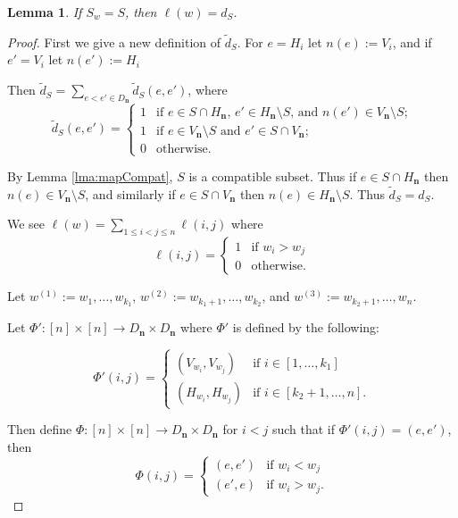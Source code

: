 \documentclass{amsart}
\newtheorem{lma}{Lemma}
\newcommand{\bfn}{\mathbf{n}}
\begin{document}
\begin{lma}\label{lma:lenMatch}
If $S_w=S$, then $\ell(w)=d_S$.
\end{lma}
\begin{proof}
First we give a new definition of $\widetilde{d}_S$. For $e=H_i$ let $n(e):=V_i$, and if $e'=V_i$ let $n(e'):=H_i$

 Then $\widetilde{d}_S=\sum\limits_{e<e'\in D_\bfn} \widetilde{d}_S(e,e')$, where
  \[
    \widetilde{d}_S(e,e')=
    \begin{cases}
      1 & \text{if $e\in S\cap H_\bfn$,  $e'\in H_\bfn\setminus S$, and $n(e')\in V_\bfn\setminus S$;}\\
      1 & \text{if $e\in V_\bfn\setminus S$ and $e'\in S\cap V_\bfn$;}\\
      0 & \text{otherwise.}
    \end{cases}
  \]


By Lemma \ref{lma:mapCompat}, $S$ is a compatible subset. Thus if $e\in S\cap H_\bfn$ then $n(e)\in V_\bfn\setminus S$, and similarly if $e\in S\cap V_\bfn$ then $n(e)\in H_\bfn\setminus S$. 
Thus $\widetilde{d}_S={d}_S$.


We see $\ell(w)=\sum\limits_{1\leq i<j\leq n} \ell(i,j)$
where 
 \[
    \ell(i,j)=
    \begin{cases}
      1 & \text{if } w_i>w_j\\
      0 & \text{otherwise.}
    \end{cases}
  \]
 
 Let $w^{(1)}:=w_1,\ldots,w_{k_1}$, $w^{(2)}:=w_{k_1+1},\ldots,w_{k_2}$, and $w^{(3)}:=w_{k_2+1},\ldots,w_{n}$. 
 
Let $\Phi':[n]\times [n]\rightarrow D_\bfn\times D_\bfn$ where $\Phi'$ is defined by the following:


 \[
    \Phi'(i,j)=
    \begin{cases}
      (V_{w_i},V_{w_j}) & \text{if } i\in[1,\ldots,k_1]\\
      (H_{w_i},H_{w_j}) & \text{if } i\in[k_2+1,\ldots,n].
    \end{cases}
  \]

 Then define $\Phi:[n]\times [n]\rightarrow D_\bfn\times D_\bfn$ for $i<j$ such that if $\Phi'(i,j)=(e,e')$, then 
\[
    \Phi(i,j)=
    \begin{cases}
      (e,e') & \text{if } w_i<w_j\\
      (e',e) & \text{if } w_i>w_j.
    \end{cases}
  \]
 

\end{proof}
\end{document}
